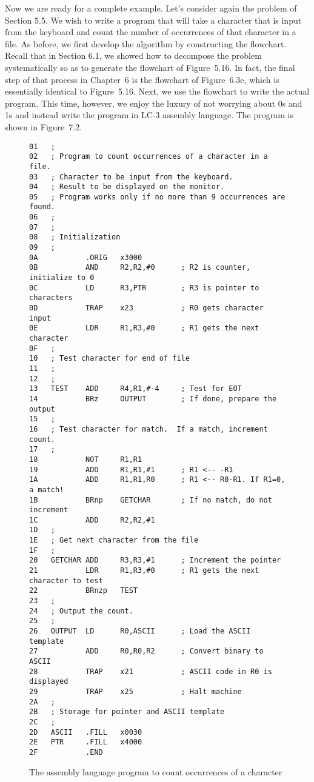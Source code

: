 \documentclass{patt}
\begin{document}
Now we are ready for a complete example.  Let's consider
again the problem of Section 5.5.  We wish to write a program that
will take a character that is input from the keyboard and
count the number of occurrences of that character in a file.  As
before, we first develop the algorithm by constructing the flowchart.
Recall that in Section 6.1, we showed how to decompose the problem
systematically so as to generate the flowchart of Figure~5.16.  In
fact, the final step of that process in Chapter~6 is the flowchart of
Figure~6.3e, which is essentially identical to Figure~5.16.  Next, we
use the flowchart to write the actual program.  This time, however, we
enjoy the luxury of not worrying about 0s and 1s and instead write the
program in LC-3 assembly language.  The program is shown in\break
Figure~7.2.

\pagebreak

\begin{figure}
\begin{Verbatim}[fontsize=\fontsize{8}{9.5}\selectfont,formatcom=\color{seventyblack}]
01   ;
02   ; Program to count occurrences of a character in a file.
03   ; Character to be input from the keyboard.
04   ; Result to be displayed on the monitor.
05   ; Program works only if no more than 9 occurrences are found.
06   ;
07   ;
08   ; Initialization
09   ;
0A           .ORIG   x3000
0B           AND     R2,R2,#0      ; R2 is counter, initialize to 0
0C           LD      R3,PTR        ; R3 is pointer to characters
0D           TRAP    x23           ; R0 gets character input
0E           LDR     R1,R3,#0      ; R1 gets the next character
0F   ;
10   ; Test character for end of file
11   ;
12   ;
13   TEST    ADD     R4,R1,#-4     ; Test for EOT
14           BRz     OUTPUT        ; If done, prepare the output
15   ;
16   ; Test character for match.  If a match, increment count.
17   ;
18           NOT     R1,R1
19           ADD     R1,R1,#1      ; R1 <-- -R1
1A           ADD     R1,R1,R0      ; R1 <-- R0-R1. If R1=0, a match!
1B           BRnp    GETCHAR       ; If no match, do not increment
1C           ADD     R2,R2,#1
1D   ;
1E   ; Get next character from the file
1F   ;
20   GETCHAR ADD     R3,R3,#1      ; Increment the pointer
21           LDR     R1,R3,#0      ; R1 gets the next character to test
22           BRnzp   TEST
23   ;
24   ; Output the count.
25   ;
26   OUTPUT  LD      R0,ASCII      ; Load the ASCII template
27           ADD     R0,R0,R2      ; Convert binary to ASCII
28           TRAP    x21           ; ASCII code in R0 is displayed
29           TRAP    x25           ; Halt machine
2A   ;
2B   ; Storage for pointer and ASCII template
2C   ;
2D   ASCII   .FILL   x0030
2E   PTR     .FILL   x4000
2F           .END
\end{Verbatim}
\caption{The assembly language program to count occurrences of a
  character}
\vspace{-12pt}
\end{figure}
\end{document}
